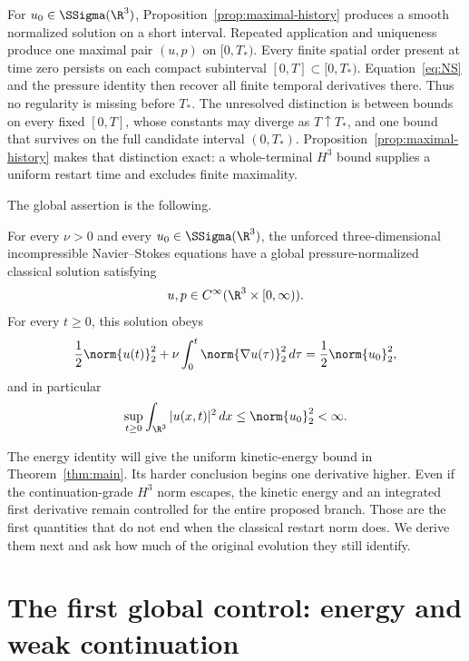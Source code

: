 For \(u_0\in\SSigma(\R^3)\), Proposition~\ref{prop:maximal-history} produces
a smooth normalized solution on a short interval.  Repeated application and
uniqueness produce one maximal pair \((u,p)\) on \([0,T_*)\).  Every finite
spatial order present at time zero persists on each compact subinterval
\([0,T]\subset[0,T_*)\).  Equation~\eqref{eq:NS} and the pressure identity
then recover all finite temporal derivatives there.  Thus no regularity is
missing before \(T_*\).  The unresolved distinction is between bounds on
every fixed \([0,T]\), whose constants may diverge as \(T\uparrow T_*\), and
one bound that survives on the full candidate interval \((0,T_*)\).
Proposition~\ref{prop:maximal-history} makes that distinction exact: a
whole-terminal \(H^3\) bound supplies a uniform restart time and excludes
finite maximality.

The global assertion is the following.

\begin{theorem}
\label{thm:main}
For every \(\nu>0\) and every \(u_0\in\SSigma(\R^3)\), the unforced
three-dimensional incompressible Navier--Stokes equations have a global
pressure-normalized classical solution satisfying
\[
 u,p\in C^\infty(\R^3\times[0,\infty)).
\]
For every \(t\ge0\), this solution obeys
\[
 \frac12\norm{u(t)}_2^2
 +\nu\int_0^t\norm{\nabla u(\tau)}_2^2\,d\tau
 =\frac12\norm{u_0}_2^2,
\]
and in particular
\begin{equation}
 \sup_{t\ge0}\int_{\R^3}|u(x,t)|^2\,dx
 \le \norm{u_0}_2^2<\infty.
 \label{eq:uniform-kinetic-energy}
\end{equation}
\end{theorem}

The energy identity will give the uniform kinetic-energy bound in
Theorem~\ref{thm:main}.  Its harder conclusion begins one derivative higher.
Even if the continuation-grade \(H^3\) norm escapes, the kinetic energy and an
integrated first derivative remain controlled for the entire proposed branch.
Those are the first quantities that do not end when the classical restart norm
does.  We derive them next and ask how much of the original evolution they
still identify.

\section{The first global control: energy and weak continuation}
\label{sec:energy-weak}

